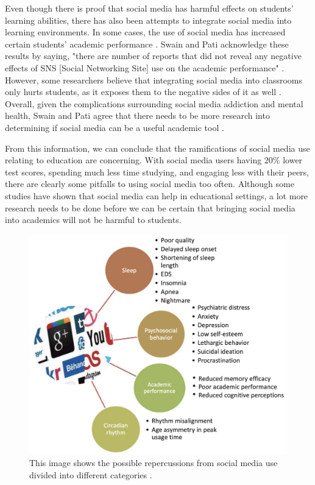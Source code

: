 \documentclass[12pt, journal, compsoc]{IEEEtran}
\begin{document}
Even though there is proof that social media has harmful effects on students' learning abilities, there has also been attempts to integrate social media into learning environments. In some cases, the use of social media has increased certain students' academic performance \cite{Repercussions}. Swain and Pati acknowledge these results by saying, "there are number of reports that did not reveal any negative effects of SNS [Social Networking Site] use on the academic performance" \cite{Repercussions}. However, some researchers believe that integrating social media into classrooms only hurts students, as it exposes them to the negative sides of it as well \cite{Repercussions}. Overall, given the complications surrounding social media addiction and mental health, Swain and Pati agree that there needs to be more research into determining if social media can be a useful academic tool \cite{Repercussions}.

From this information, we can conclude that the ramifications of social media use relating to education are concerning. With social media users having 20\% lower test scores, spending much less time studying, and engaging less with their peers, there are clearly some pitfalls to using social media too often. Although some studies have shown that social media can help in educational settings, a lot more research needs to be done before we can be certain that bringing social media into academics will not be harmful to students.

\begin{figure}[h]
    \noindent\includegraphics[width = \linewidth]{repercussions.png}
    \caption{This image shows the possible repercussions from social media use divided into different categories \cite{Repercussions}.}
\end{figure}
\end{document}
